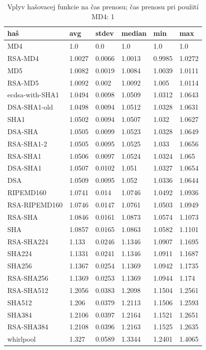 \documentclass[12pt,a4paper]{article}
\begin{document}
\begin{table}[h]\centering
    \begin{tabular}{|l||l|l|l|l|l|}
        \hline
        \bf haš & \bf  avg & \bf stdev & \bf median & \bf min & \bf max \\ \hline 
        MD4 & 1.0 & 0.0 & 1.0 & 1.0 & 1.0 \\ \hline
        RSA-MD4 & 1.0027 & 0.0066 & 1.0013 & 0.9985 & 1.0272 \\ \hline
        MD5 & 1.0082 & 0.0019 & 1.0084 & 1.0039 & 1.0111 \\ \hline
        RSA-MD5 & 1.0092 & 0.002 & 1.0092 & 1.005 & 1.0114 \\ \hline
        ecdsa-with-SHA1 & 1.0494 & 0.0098 & 1.0509 & 1.0312 & 1.0643 \\ \hline
        DSA-SHA1-old & 1.0498 & 0.0094 & 1.0512 & 1.0328 & 1.0631 \\ \hline
        SHA1 & 1.0502 & 0.0094 & 1.0507 & 1.032 & 1.0627 \\ \hline
        DSA-SHA & 1.0505 & 0.0099 & 1.0523 & 1.0328 & 1.0649 \\ \hline
        RSA-SHA1-2 & 1.0505 & 0.0095 & 1.0525 & 1.033 & 1.0656 \\ \hline
        RSA-SHA1 & 1.0506 & 0.0097 & 1.0524 & 1.0324 & 1.065 \\ \hline
        DSA-SHA1 & 1.0507 & 0.0102 & 1.051 & 1.0327 & 1.0654 \\ \hline
        DSA & 1.0509 & 0.0095 & 1.052 & 1.0336 & 1.0644 \\ \hline
        RIPEMD160 & 1.0741 & 0.014 & 1.0746 & 1.0492 & 1.0936 \\ \hline
        RSA-RIPEMD160 & 1.0746 & 0.0147 & 1.0761 & 1.0503 & 1.0949 \\ \hline
        RSA-SHA & 1.0846 & 0.0161 & 1.0873 & 1.0574 & 1.1073 \\ \hline
        SHA & 1.0857 & 0.0165 & 1.0863 & 1.0582 & 1.1101 \\ \hline
        RSA-SHA224 & 1.133 & 0.0246 & 1.1346 & 1.0907 & 1.1695 \\ \hline
        SHA224 & 1.1331 & 0.0241 & 1.1346 & 1.0911 & 1.1687 \\ \hline
        SHA256 & 1.1367 & 0.0254 & 1.1369 & 1.0942 & 1.1735 \\ \hline
        RSA-SHA256 & 1.1369 & 0.0253 & 1.1369 & 1.0944 & 1.174 \\ \hline
        RSA-SHA512 & 1.2056 & 0.0383 & 1.2098 & 1.1504 & 1.2561 \\ \hline
        SHA512 & 1.206 & 0.0379 & 1.2113 & 1.1506 & 1.2593 \\ \hline
        SHA384 & 1.2106 & 0.0397 & 1.2164 & 1.1521 & 1.2651 \\ \hline
        RSA-SHA384 & 1.2108 & 0.0396 & 1.2163 & 1.1525 & 1.2635 \\ \hline
        whirlpool & 1.327 & 0.0589 & 1.3344 & 1.2401 & 1.4065 \\ \hline
    \end{tabular}
    \caption{Vplyv hašovacej funkcie na čas prenosu; čas prenosu pri použití MD4: 1}
    \label{tbl:digest-comparison}
\end{table}
\end{document}
